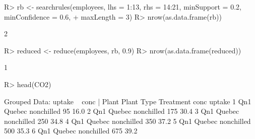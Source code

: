 \documentclass{article}\usepackage[]{graphicx}\usepackage[]{color}
\begin{document}
\begin{Schunk}
% --begin: "reduce"
\begin{Sinput}
R> rb <- searchrules(employees, lhs = 1:13, rhs = 14:21, minSupport = 0.2, minConfidence = 0.6, 
+      maxLength = 3)
R> nrow(as.data.frame(rb))
\end{Sinput}
\begin{Soutput}
[1] 2
\end{Soutput}
\begin{Sinput}
R> reduced <- reduce(employees, rb, 0.9)
R> nrow(as.data.frame(reduced))
\end{Sinput}
\begin{Soutput}
[1] 1
\end{Soutput}
%
% --end: "reduce"
\end{Schunk}

\begin{Schunk}
% --begin: "pbld1"
\begin{Sinput}
R> head(CO2)
\end{Sinput}
\begin{Soutput}
Grouped Data: uptake ~ conc | Plant
  Plant   Type  Treatment conc uptake
1   Qn1 Quebec nonchilled   95   16.0
2   Qn1 Quebec nonchilled  175   30.4
3   Qn1 Quebec nonchilled  250   34.8
4   Qn1 Quebec nonchilled  350   37.2
5   Qn1 Quebec nonchilled  500   35.3
6   Qn1 Quebec nonchilled  675   39.2
\end{Soutput}
%
% --end: "pbld1"
\end{Schunk}
\end{document}
